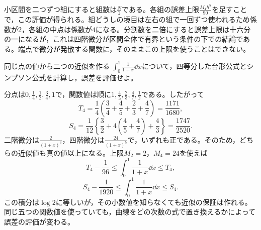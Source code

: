 小区間を二つずつ組にすると組数は$\frac N2$である。各組の誤差上限$\frac{M_4h^5}{90}$を足すことで，この評価が得られる。組どうしの境目は左右の組で一回ずつ使われるため係数が$2$，各組の中点は係数が$4$になる。分割数を二倍にすると誤差上限は十六分の一になるが，これは四階微分が区間全体で有界という条件の下での結論である。端点で微分が発散する関数に，そのままこの上限を使うことはできない。

\begin{example}{同じ点の値から二つの近似を作る}
$\int_0^1\frac1{1+x}\dd x$について，四等分した台形公式とシンプソン公式を計算し，誤差を評価せよ。
\end{example}

分点は$0,\frac14,\frac12,\frac34,1$で，関数値は順に$1,\frac45,\frac23,\frac47,\frac12$である。したがって
\[
 T_4=\frac14\left(\frac34+\frac45+\frac23+\frac47\right)
 =\frac{1171}{1680},
\]
\[
 S_4=\frac1{12}\left\{\frac32+4\left(\frac45+\frac47\right)+\frac43\right\}
 =\frac{1747}{2520}.
\]
二階微分は$\frac2{(1+x)^3}$，四階微分は$\frac{24}{(1+x)^5}$で，いずれも正である。そのため，どちらの近似値も真の値以上になる。上限$M_2=2$，$M_4=24$を使えば
\[
 T_4-\frac1{96}\leq\int_0^1\frac1{1+x}\dd x\leq T_4,
\]
\[
 S_4-\frac1{1920}\leq\int_0^1\frac1{1+x}\dd x\leq S_4.
\]
この積分は$\log2$に等しいが，その小数値を知らなくても近似の保証は作れる。同じ五つの関数値を使っていても，曲線をどの次数の式で置き換えるかによって誤差の評価が変わる。

